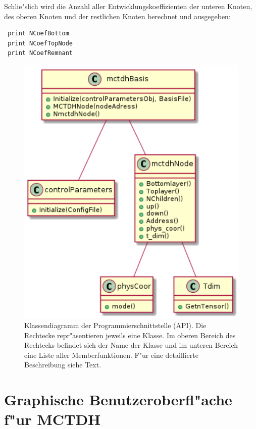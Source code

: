 Schlie"slich wird die Anzahl aller Entwicklungskoeffizienten der unteren Knoten, des oberen Knoten
und der restlichen Knoten berechnet und ausgegeben:
\begin{verbatim}
 print NCoefBottom 
 print NCoefTopNode 
 print NCoefRemnant
\end{verbatim}
    
\begin{figure}
    \centering
    \includegraphics[scale=1]{figures/sequenceDiagram}
    \caption{Klassendiagramm der Programmierschnittstelle (API). Die Rechtecke repr"asentieren jeweils eine Klasse.
    Im oberen Bereich des Rechtecks befindet sich der Name der Klasse und im unteren Bereich eine Liste aller
    Memberfunktionen. F"ur eine detaillierte Beschreibung siehe Text.}\label{fig:uml_Cython}
\end{figure}



\section{Graphische Benutzeroberfl"ache f"ur MCTDH}

